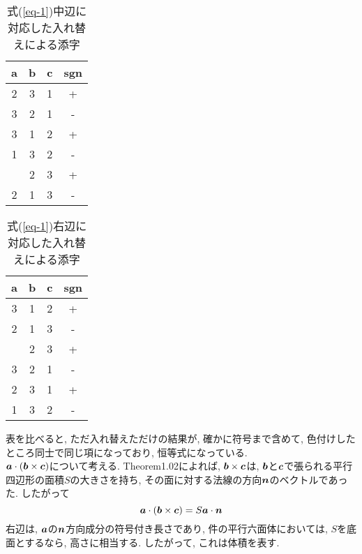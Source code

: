 \documentclass{jsarticle}
\newcommand*{\mbold}[1]{\mbox{\boldmath $#1$}}
\begin{document}
\begin{table}[hbtp]
  \caption{式(\ref{eq-1})中辺に対応した入れ替えによる添字}
  \centering
  \begin{tabular}{|c|c|c|c|}
    \hline
    a & b & c & sgn \\
    \hline \hline
    \rowcolor{green}2 & 3 & 1 & + \\
    \hdashline
    \rowcolor{magenta}3 & 2 & 1 & - \\
    \hdashline
    \rowcolor{cyan}3 & 1 & 2 & + \\
    \hdashline
    \rowcolor{yellow}1 & 3 & 2 & - \\
    \hdashline
    1 & 2 & 3 & + \\
    \hdashline
    \rowcolor{red}2 & 1 & 3 & - \\
    \hline
  \end{tabular}
\end{table}

\begin{table}[hbtp]
  \caption{式(\ref{eq-1})右辺に対応した入れ替えによる添字}
  \centering
  \begin{tabular}{|c|c|c|c|}
    \hline
    a & b & c & sgn \\
    \hline \hline
    \rowcolor{cyan}3 & 1 & 2 & + \\
    \hdashline
    \rowcolor{red}2 & 1 & 3 & - \\
    \hdashline
    1 & 2 & 3 & + \\
    \hdashline
    \rowcolor{magenta}3 & 2 & 1 & - \\
    \hdashline
    \rowcolor{green}2 & 3 & 1 & + \\
    \hdashline
    \rowcolor{yellow}1 & 3 & 2 & - \\
    \hline
  \end{tabular}
\end{table}
表を比べると, ただ入れ替えただけの結果が, 確かに符号まで含めて, 色付けしたところ同士で同じ項になっており, 恒等式になっている. 
\\

$\mbold{a} \cdot (\mbold{b} \times \mbold{c})$について考える. Theorem1.02によれば, $\mbold{b} \times \mbold{c}$は, $\mbold{b}$と$\mbold{c}$で張られる平行四辺形の面積$S$の大きさを持ち, その面に対する法線の方向$\mbold{n}$のベクトルであった. 
したがって
\[
  \mbold{a} \cdot (\mbold{b} \times \mbold{c}) = S \mbold{a} \cdot \mbold{n}
\]
右辺は, $\mbold{a}$の$\mbold{n}$方向成分の符号付き長さであり, 件の平行六面体においては, $S$を底面とするなら, 高さに相当する. 
したがって, これは体積を表す. 
\end{document}
